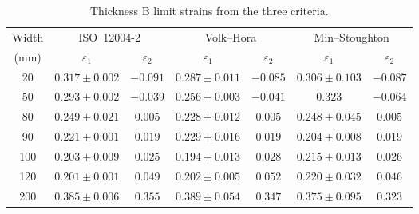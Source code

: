\begin{table}[H]
    \centering
    \small
    \begin{tabular}{c c c c c c c}
        \toprule
        Width & \multicolumn{2}{c}{ISO~12004-2} & \multicolumn{2}{c}{Volk--Hora} & \multicolumn{2}{c}{Min--Stoughton} \\
        \cmidrule(lr){2-3}\cmidrule(lr){4-5}\cmidrule(lr){6-7}
        (\si{\milli\meter}) & $\varepsilon_1$ & $\varepsilon_2$ & $\varepsilon_1$ & $\varepsilon_2$ & $\varepsilon_1$ & $\varepsilon_2$ \\
        \midrule
        20  & $0.317 \pm 0.002$ & $-0.091$ & $0.287 \pm 0.011$ & $-0.085$ & $0.306 \pm 0.103$ & $-0.087$ \\
        50  & $0.293 \pm 0.002$ & $-0.039$ & $0.256 \pm 0.003$ & $-0.041$ & $0.323$           & $-0.064$ \\
        80  & $0.249 \pm 0.021$ & $0.005$  & $0.228 \pm 0.012$ & $0.005$  & $0.248 \pm 0.045$ & $0.005$ \\
        90  & $0.221 \pm 0.001$ & $0.019$  & $0.229 \pm 0.016$ & $0.019$  & $0.204 \pm 0.008$ & $0.019$ \\
        100 & $0.203 \pm 0.009$ & $0.025$  & $0.194 \pm 0.013$ & $0.028$  & $0.215 \pm 0.013$ & $0.026$ \\
        120 & $0.201 \pm 0.001$ & $0.049$  & $0.202 \pm 0.005$ & $0.052$  & $0.220 \pm 0.032$ & $0.046$ \\
        200 & $0.385 \pm 0.006$ & $0.355$  & $0.389 \pm 0.054$ & $0.347$  & $0.375 \pm 0.095$ & $0.323$ \\
        \bottomrule
    \end{tabular}
    \caption[Min--Stoughton campaign comparison, thickness~B]{Thickness B limit strains from the three criteria.}
    \label{tab:ms_campaign_B}
\end{table}

